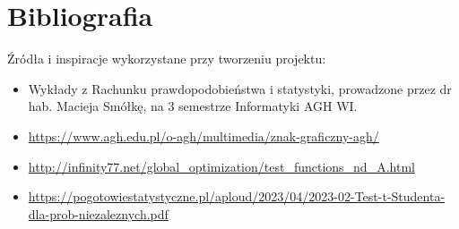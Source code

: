 \documentclass{lab}
\begin{document}
\newpage
\section{Bibliografia}
Źródła i inspiracje wykorzystane przy tworzeniu projektu:
\begin{itemize}
  \item Wykłady z Rachunku prawdopodobieństwa i statystyki, prowadzone przez dr hab. Macieja Smółkę, na 3 semestrze Informatyki AGH WI.
  \item \url{https://www.agh.edu.pl/o-agh/multimedia/znak-graficzny-agh/}
  \item \url{http://infinity77.net/global_optimization/test_functions_nd_A.html}
  \item
  \url{https://pogotowiestatystyczne.pl/aploud/2023/04/2023-02-Test-t-Studenta-dla-prob-niezaleznych.pdf}
\end{itemize}
\end{document}
